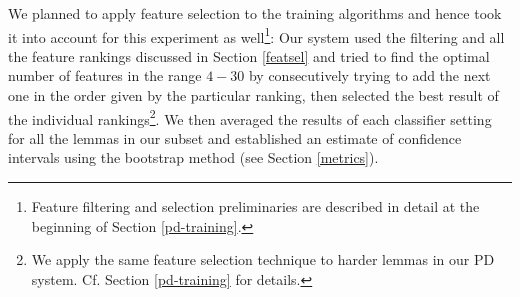 \documentclass[12pt,notitlepage]{report}
\begin{document}
We planned to apply feature selection to the training algorithms and hence took it into account for this experiment as well\footnote{Feature filtering and selection preliminaries are described in detail at the beginning of Section \ref{pd-training}.}: Our system used the filtering and all the feature rankings discussed in Section \ref{featsel} and tried to find the optimal number of features in the range $4-30$ by consecutively trying to add the next one in the order given by the particular ranking, then selected the best result of the individual rankings\footnote{We apply the same feature selection technique to harder lemmas in our PD system. Cf. Section \ref{pd-training} for details.}. We then averaged the results of each classifier setting for all the lemmas in our subset and established an estimate of confidence intervals using the bootstrap method (see Section \ref{metrics}).
\end{document}
